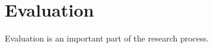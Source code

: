 \section{Evaluation}
\label{sec:evaluation}

Evaluation is an important part of the research process.
